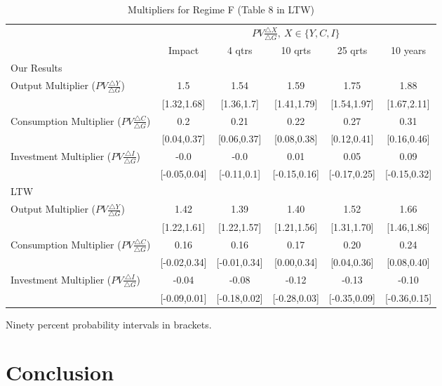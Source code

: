 \documentclass[letterpaper,12pt]{article}%
\begin{document}
\begin{table}[H]
	\centering
	\begin{threeparttable}
		\caption{Multipliers for Regime F (Table 8 in LTW)}
		\begin{tabular}{l c c c c c}
			\toprule
			& \multicolumn{5}{c}{$PV \frac{\triangle X}{\triangle G} , \ X \in \{Y,C,I\}$}\\
			\cmidrule{2-6}
			& Impact & 4 qtrs & 10 qrts & 25 qrts & 10 years \\
			\midrule
			Our Results&     &   &  &   &   \\
			\quad Output Multiplier ($PV \frac{ \triangle Y}{\triangle G}$)&  1.5 & 1.54 & 1.59 & 1.75 & 1.88 \\
			\quad &  [1.32,1.68] & [1.36,1.7] & [1.41,1.79] & [1.54,1.97] & [1.67,2.11] \\
			\quad Consumption Multiplier ($PV \frac{ \triangle C}{\triangle G}$)&  0.2 & 0.21 & 0.22 & 0.27 & 0.31\\
			\quad &   [0.04,0.37] & [0.06,0.37] & [0.08,0.38] & [0.12,0.41] & [0.16,0.46] \\
			\quad Investment Multiplier ($PV \frac{ \triangle I}{\triangle G}$)&  -0.0 & -0.0 & 0.01 & 0.05 & 0.09 \\
			\quad &   [-0.05,0.04] & [-0.11,0.1] & [-0.15,0.16] & [-0.17,0.25] & [-0.15,0.32] \\
			LTW&     &   &  &   &   \\
			\quad Output Multiplier ($PV \frac{ \triangle Y}{\triangle G}$)&  1.42 & 1.39 & 1.40 & 1.52 & 1.66 \\
			\quad &   [1.22,1.61] & [1.22,1.57] & [1.21,1.56] & [1.31,1.70] & [1.46,1.86] \\
			\quad Consumption Multiplier ($PV \frac{ \triangle C}{\triangle G}$)&  0.16 & 0.16 & 0.17 & 0.20 & 0.24\\
			\quad &   [-0.02,0.34] & [-0.01,0.34] & [0.00,0.34] & [0.04,0.36] & [0.08,0.40] \\
			\quad Investment Multiplier ($PV \frac{ \triangle I}{\triangle G}$)&  -0.04 & -0.08 & -0.12 & -0.13 & -0.10 \\
			\quad &   [-0.09,0.01] & [-0.18,0.02] & [-0.28,0.03] & [-0.35,0.09] & [-0.36,0.15] \\
			\bottomrule    
		\end{tabular}
	\begin{tablenotes}
		\item Ninety percent probability intervals in brackets.
	\end{tablenotes}
		\label{tab:RWMH_F}
	\end{threeparttable}
\end{table}




\section{Conclusion}
\end{document}
